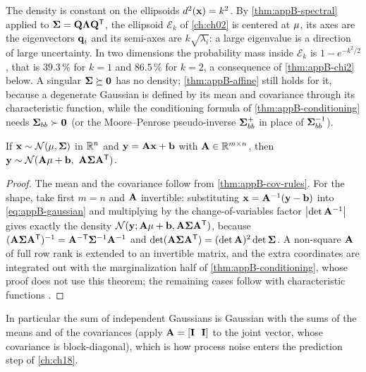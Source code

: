 The density is constant on the ellipsoids $d^2(\mathbf{x}) = k^2$. By
\cref{thm:appB-spectral} applied to $\mathbf{\Sigma} =
\mathbf{Q}\mathbf{\Lambda}\mathbf{Q}^{\mathsf{T}}$, the ellipsoid $\mathcal{E}_k$ of \cref{ch:ch02}
is centered at $\mathbf{\mu}$, its axes are the eigenvectors $\mathbf{q}_i$ and its
semi-axes are $k\sqrt{\lambda_i}$: a large eigenvalue is a direction of large
uncertainty. In two dimensions the probability mass inside $\mathcal{E}_k$ is
$1 - e^{-k^2/2}$, that is $39.3\,\%$ for $k = 1$ and $86.5\,\%$ for $k = 2$, a
consequence of \cref{thm:appB-chi2} below. A singular $\mathbf{\Sigma} \succeq
\mathbf{0}$ has no density; \cref{thm:appB-affine} still holds for it, because a
degenerate Gaussian is defined by its mean and covariance through its
characteristic function, while the conditioning formula of
\cref{thm:appB-conditioning} needs $\mathbf{\Sigma}_{bb} \succ \mathbf{0}$ (or the
Moore--Penrose pseudo-inverse $\mathbf{\Sigma}_{bb}^{+}$ in place of
$\mathbf{\Sigma}_{bb}^{-1}$).

\begin{theorem}
\label{thm:appB-affine}
If $\mathbf{x} \sim \mathcal{N}(\mathbf{\mu}, \mathbf{\Sigma})$ in $\mathbb{R}^n$ and $\mathbf{y} = \mathbf{A}\mathbf{x} + \mathbf{b}$ with $\mathbf{A} \in \mathbb{R}^{m \times n}$, then $\mathbf{y} \sim \mathcal{N}(\mathbf{A}\mathbf{\mu} + \mathbf{b},\ \mathbf{A}\mathbf{\Sigma}\mathbf{A}^{\mathsf{T}})$.
\end{theorem}
\begin{proof}
The mean and the covariance follow from \cref{thm:appB-cov-rules}. For the shape, take first $m = n$ and $\mathbf{A}$ invertible: substituting $\mathbf{x} = \mathbf{A}^{-1}(\mathbf{y} - \mathbf{b})$ into \cref{eq:appB-gaussian} and multiplying by the change-of-variables factor $\left\lvert \det\mathbf{A}^{-1} \right\rvert$ gives exactly the density $\mathcal{N}(\mathbf{y}; \mathbf{A}\mathbf{\mu} + \mathbf{b}, \mathbf{A}\mathbf{\Sigma}\mathbf{A}^{\mathsf{T}})$, because $(\mathbf{A}\mathbf{\Sigma}\mathbf{A}^{\mathsf{T}})^{-1} = \mathbf{A}^{-\mathsf{T}}\mathbf{\Sigma}^{-1}\mathbf{A}^{-1}$ and $\det(\mathbf{A}\mathbf{\Sigma}\mathbf{A}^{\mathsf{T}}) = (\det\mathbf{A})^2\det\mathbf{\Sigma}$. A non-square $\mathbf{A}$ of full row rank is extended to an invertible matrix, and the extra coordinates are integrated out with the marginalization half of \cref{thm:appB-conditioning}, whose proof does not use this theorem; the remaining cases follow with characteristic functions \cite{sarkka2013bayesian}. \qedhere
\end{proof}

In particular the sum of independent Gaussians is Gaussian with the sums of
the means and of the covariances (apply $\mathbf{A} = [\mathbf{I}\ \ \mathbf{I}]$ to
the joint vector, whose covariance is block-diagonal), which is how process
noise enters the prediction step of \cref{ch:ch18}.

